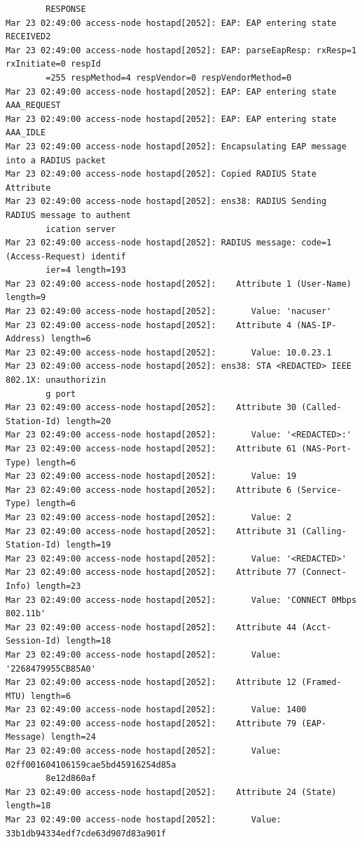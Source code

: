 \documentclass[11pt]{article}
\begin{document}
\begin{verbatim}
        RESPONSE
Mar 23 02:49:00 access-node hostapd[2052]: EAP: EAP entering state RECEIVED2
Mar 23 02:49:00 access-node hostapd[2052]: EAP: parseEapResp: rxResp=1 rxInitiate=0 respId
        =255 respMethod=4 respVendor=0 respVendorMethod=0
Mar 23 02:49:00 access-node hostapd[2052]: EAP: EAP entering state AAA_REQUEST
Mar 23 02:49:00 access-node hostapd[2052]: EAP: EAP entering state AAA_IDLE
Mar 23 02:49:00 access-node hostapd[2052]: Encapsulating EAP message into a RADIUS packet
Mar 23 02:49:00 access-node hostapd[2052]: Copied RADIUS State Attribute
Mar 23 02:49:00 access-node hostapd[2052]: ens38: RADIUS Sending RADIUS message to authent
        ication server
Mar 23 02:49:00 access-node hostapd[2052]: RADIUS message: code=1 (Access-Request) identif
        ier=4 length=193
Mar 23 02:49:00 access-node hostapd[2052]:    Attribute 1 (User-Name) length=9
Mar 23 02:49:00 access-node hostapd[2052]:       Value: 'nacuser'
Mar 23 02:49:00 access-node hostapd[2052]:    Attribute 4 (NAS-IP-Address) length=6
Mar 23 02:49:00 access-node hostapd[2052]:       Value: 10.0.23.1
Mar 23 02:49:00 access-node hostapd[2052]: ens38: STA <REDACTED> IEEE 802.1X: unauthorizin
        g port
Mar 23 02:49:00 access-node hostapd[2052]:    Attribute 30 (Called-Station-Id) length=20
Mar 23 02:49:00 access-node hostapd[2052]:       Value: '<REDACTED>:'
Mar 23 02:49:00 access-node hostapd[2052]:    Attribute 61 (NAS-Port-Type) length=6
Mar 23 02:49:00 access-node hostapd[2052]:       Value: 19
Mar 23 02:49:00 access-node hostapd[2052]:    Attribute 6 (Service-Type) length=6
Mar 23 02:49:00 access-node hostapd[2052]:       Value: 2
Mar 23 02:49:00 access-node hostapd[2052]:    Attribute 31 (Calling-Station-Id) length=19
Mar 23 02:49:00 access-node hostapd[2052]:       Value: '<REDACTED>'
Mar 23 02:49:00 access-node hostapd[2052]:    Attribute 77 (Connect-Info) length=23
Mar 23 02:49:00 access-node hostapd[2052]:       Value: 'CONNECT 0Mbps 802.11b'
Mar 23 02:49:00 access-node hostapd[2052]:    Attribute 44 (Acct-Session-Id) length=18
Mar 23 02:49:00 access-node hostapd[2052]:       Value: '2268479955CB85A0'
Mar 23 02:49:00 access-node hostapd[2052]:    Attribute 12 (Framed-MTU) length=6
Mar 23 02:49:00 access-node hostapd[2052]:       Value: 1400
Mar 23 02:49:00 access-node hostapd[2052]:    Attribute 79 (EAP-Message) length=24
Mar 23 02:49:00 access-node hostapd[2052]:       Value: 02ff001604106159cae5bd45916254d85a
        8e12d860af
Mar 23 02:49:00 access-node hostapd[2052]:    Attribute 24 (State) length=18
Mar 23 02:49:00 access-node hostapd[2052]:       Value: 33b1db94334edf7cde63d907d83a901f

\end{verbatim}
\end{document}
